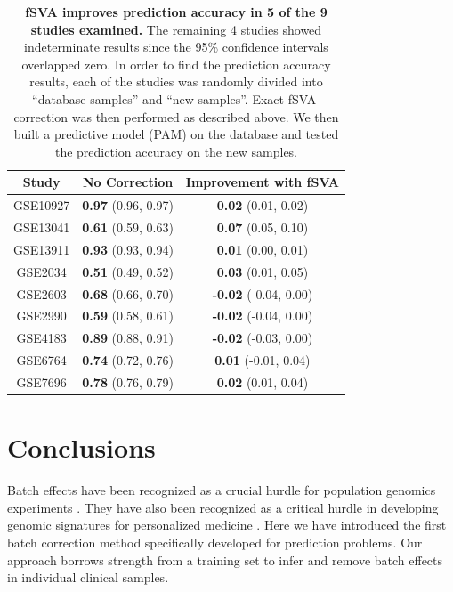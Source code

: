 \documentclass{bioinfo}
\begin{document}
\begin{table}
\begin{center}
\begin{tabular}{ccc}
  \hline
Study & No Correction &  Improvement with fSVA \\
  \hline
GSE10927 & \textbf{0.97} (0.96, 0.97) & \textbf{0.02} (0.01, 0.02) \\
GSE13041 & \textbf{0.61} (0.59, 0.63) & \textbf{0.07} (0.05, 0.10) \\
GSE13911 & \textbf{0.93} (0.93, 0.94) & \textbf{0.01} (0.00, 0.01) \\
GSE2034 & \textbf{0.51} (0.49, 0.52) & \textbf{0.03} (0.01, 0.05) \\
GSE2603 & \textbf{0.68} (0.66, 0.70) & \textbf{-0.02} (-0.04, 0.00) \\
GSE2990 & \textbf{0.59} (0.58, 0.61) & \textbf{-0.02} (-0.04, 0.00) \\
GSE4183 & \textbf{0.89} (0.88, 0.91) & \textbf{-0.02} (-0.03, 0.00) \\
GSE6764 & \textbf{0.74} (0.72, 0.76) & \textbf{0.01} (-0.01, 0.04) \\
GSE7696 & \textbf{0.78} (0.76, 0.79) & \textbf{0.02} (0.01, 0.04) \\
   \hline
\end{tabular}
\caption{\textbf{fSVA improves prediction accuracy in 5 of the 9 studies examined.} The remaining 4 studies showed indeterminate results since the 95\% confidence intervals overlapped zero.  In order to find the prediction accuracy results, each of the studies was randomly divided into ``database samples'' and ``new samples''.  Exact fSVA-correction was then performed as described above.  We then built a predictive model (PAM) on the database and tested the prediction accuracy on the new samples.}
\end{center}
\label{studytab}
\end{table}


\section{Conclusions}

Batch effects have been recognized as a crucial hurdle for population genomics experiments \cite{Leek2010,Parker2012}. They have also been recognized as a critical hurdle in developing genomic signatures for personalized medicine \cite{Micheel2012}. Here we have introduced the first batch correction method specifically developed for prediction problems. Our approach borrows strength from a training set to infer and remove batch effects in individual clinical samples. 
\end{document}
